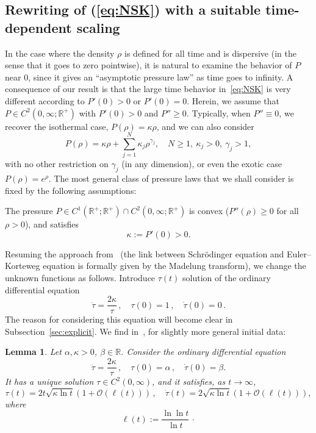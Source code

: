 \documentclass[11pt]{article}
\newtheorem{lemm}[theo]{Lemma}
\theoremstyle{definition}
\numberwithin{equation}{section}
\numberwithin{figure}{section}
\numberwithin{table}{section}
\newcommand*\R{\mathbb{R}}
\newcommand*\calO{\mathcal{O}}
\newcommand*\<{\left\langle}
\renewcommand*\>{\right\rangle}
\renewcommand*\ge{\geqslant}
\begin{document}
\subsection{Rewriting of (\ref{eq:NSK}) with a suitable time-dependent scaling}\label{sec:large-time}

In the case where the density $\rho$ is defined for all time and is dispersive (in the sense that it goes to zero pointwise), it is natural to examine the behavior of $P$ near $0$, since it gives an ``asymptotic pressure law'' as time goes to infinity. A consequence of our result is that the large time behavior in~\eqref{eq:NSK} is very different according to $P'(0)>0$ or $P'(0)=0$. Herein, we assume that $P\in C^2(0,\infty;\R^+)$ with $P'(0)>0$ and $P''\ge 0$. Typically, when $P''\equiv 0$, we recover the isothermal case, $P(\rho)=\kappa\rho$, and we can also consider
\begin{equation*}
P(\rho)=\kappa \rho +\sum_{j=1}^N
\kappa_j\rho^{\gamma_j},\quad N\ge 1,\ \kappa_j>0,\ \gamma_j>1,
\end{equation*}
with no other restriction on $\gamma_j$ (in any dimension), or even the exotic case $P(\rho)=e^\rho$. The most general class of pressure laws that we shall consider is fixed by the following assumptions:

\begin{hyp}\label{hyp:P-temps-long}
The pressure $P\in C^1(\R^+;\R^+)\cap C^2(0,\infty;\R^+)$ is convex ($P''(\rho)\ge 0$ for all $\rho> 0$), and satisfies
\[
\kappa:=P'(0)>0.
\]
\end{hyp}

Resuming the approach from~\cite{CaGa18} (the link between Schr\"odinger equation and Euler--Korteweg equation is formally given by the Madelung transform), we change the unknown functions as follows. Introduce $\tau(t)$ solution of the ordinary differential equation
\begin{equation}\label{eq:tau}
\ddot \tau = \frac{2\kappa }{\tau} \,,\quad \tau(0)=1\,,\quad \dot
\tau(0)=0\,.
\end{equation}
The reason for considering this equation will become clear in Subsection~\ref{sec:explicit}. We find in~\cite{CaGa18}, for slightly more general initial data:

\begin{lemm}\label{lem:taubis}
Let $\alpha,\kappa>0$, $\beta\in \R$. Consider the ordinary differential equation
\begin{equation}\label{eq:taugen}
\ddot \tau = \frac{2\kappa }{\tau} \,,\quad \tau(0)=\alpha\,,\quad \dot
\tau(0)=\beta.
\end{equation}
It has a unique solution $\tau\in C^2(0,\infty)$, and it satisfies, as $t\to \infty$,
\begin{equation*}
\tau(t)= 2t \sqrt{\kappa \ln t}\left(1+\calO(\ell(t))\right) \,,\quad \dot
\tau(t)=2\sqrt{\kappa\ln t}\left(1+\calO(\ell(t))\right),
\end{equation*}
where
\begin{equation*}
\ell (t):= \frac{\ln \ln t}{ \ln t} \, \cdotp
\end{equation*}
\end{lemm}
\end{document}
